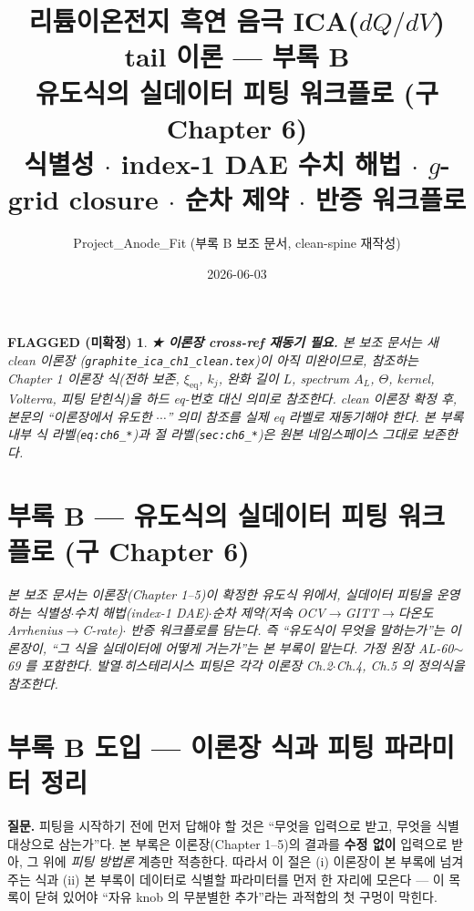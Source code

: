 \documentclass[11pt,a4paper]{article}
\title{\textbf{리튬이온전지 흑연 음극 ICA($dQ/dV$) tail 이론 — 부록 B}\\[0.4em]
\large 유도식의 실데이터 피팅 워크플로 (구 Chapter 6)\\[0.2em]
\normalsize 식별성 $\cdot$ index-1 DAE 수치 해법 $\cdot$ $g$-grid closure $\cdot$ 순차 제약 $\cdot$ 반증 워크플로}
\author{Project\_Anode\_Fit (부록 B 보조 문서, clean-spine 재작성)}
\date{2026-06-03}
\newtheorem*{flagbox}{FLAGGED (미확정)}
\newcommand{\eq}{\mathrm{eq}}
\begin{document}
\maketitle

\begin{flagbox}
\textbf{★ 이론장 cross-ref 재동기 필요.} 본 보조 문서는 새 clean 이론장
(\texttt{graphite\_ica\_ch1\_clean.tex})이 아직 미완이므로, 참조하는 Chapter 1 이론장 식(전하 보존,
$\xi_{\eq}$, $k_j$, 완화 길이 $L$, spectrum $A_L$, $\Theta$, kernel, Volterra, 피팅 닫힌식)을 \emph{하드
eq-번호 대신 의미로} 참조한다. clean 이론장 확정 후, 본문의 ``이론장에서 유도한 $\cdots$'' 의미 참조를 실제
eq 라벨로 재동기해야 한다. 본 부록 \emph{내부} 식 라벨(\texttt{eq:ch6\_*})과 절 라벨(\texttt{sec:ch6\_*})은
원본 네임스페이스 그대로 보존한다.
\end{flagbox}

\section*{\normalfont\Large 부록 B — 유도식의 실데이터 피팅 워크플로 (구 Chapter 6)}
\label{sec:ch1_fitting_practice}
\noindent\emph{본 보조 문서는 이론장(Chapter 1--5)이 확정한 유도식 위에서, 실데이터 피팅을 운영하는
식별성$\cdot$수치 해법(index-1 DAE)$\cdot$순차 제약(저속 OCV$\to$GITT$\to$다온도 Arrhenius$\to$C-rate)$\cdot$
반증 워크플로를 담는다. 즉 ``유도식이 무엇을 말하는가''는 이론장이, ``그 식을 실데이터에 어떻게 거는가''는
본 부록이 맡는다. 가정 원장 AL-60$\sim$69 를 포함한다. 발열$\cdot$히스테리시스 피팅은 각각 이론장 Ch.2$\cdot$Ch.4,
Ch.5 의 정의식을 참조한다.}

\section{부록 B 도입 — 이론장 식과 피팅 파라미터 정리}\label{sec:ch6_inherit}
\textbf{질문.} 피팅을 시작하기 전에 먼저 답해야 할 것은 ``무엇을 입력으로 받고, 무엇을 식별 대상으로 삼는가''다.
본 부록은 이론장(Chapter 1--5)의 결과를 \textbf{수정 없이} 입력으로 받아, 그 위에 \emph{피팅 방법론} 계층만
적층한다. 따라서 이 절은 (i) 이론장이 본 부록에 넘겨주는 식과 (ii) 본 부록이 데이터로 식별할 파라미터를 먼저
한 자리에 모은다 — 이 목록이 닫혀 있어야 ``자유 knob 의 무분별한 추가''라는 과적합의 첫 구멍이 막힌다.
\end{document}
